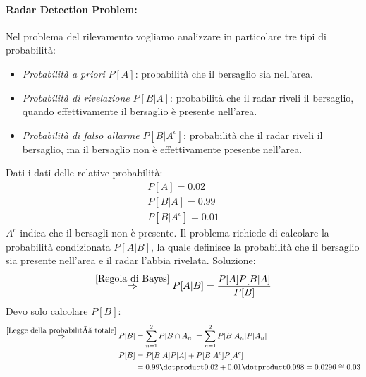             \paragraph{Radar Detection Problem:} Nel problema del rilevamento vogliamo analizzare in particolare tre tipi di probabilità:
                \begin{itemize}
                    \item {
                        \emph{Probabilità a priori} $P[A]$: probabilità che il bersaglio sia nell'area.
                    }
                    \item {
                        \emph{Probabilità di rivelazione} $P[B|A]$: probabilità che il radar riveli il bersaglio, quando effettivamente il bersaglio
                         è presente nell'area.
                    }
                    \item {
                        \emph{Probabilità di falso allarme} $P[B|A^c]$: probabilità che il radar riveli il bersaglio, ma il bersaglio non
                         è effettivamente presente nell'area. 
                    }
                \end{itemize}
                Dati i dati delle relative probabilità:
                \begin{gather}
                    P[A] = 0.02 \nonumber \\
                    P[B|A] = 0.99 \nonumber \\
                    P[B|A^c] = 0.01 \nonumber 
                \end{gather}
                $A^c$ indica che il bersagli non è presente. Il problema richiede di calcolare la probabilità condizionata
                $P[A|B]$, la quale definisce la probabilità che il bersaglio sia presente nell'area e il radar l'abbia rivelata.
                Soluzione:
                \[
                    \overset{\ref{Regola di Bayes}}{\Rightarrow} P[A|B] = \frac{P[A]P[B|A]}{P[B]}    
                \]                    
                Devo solo calcolare $P[B]$:
                \begin{align}
                        \overset{\ref{Legge della probabilità totale}}{\Rightarrow} P[B] &= \sum_{n=1}^{2} P[B\cap A_n] = \sum_{n=1}^{2} P[B|A_n] P[A_n] \nonumber \\
                        P[B] &= P[B|A]P[A] + P[B|A^c]P[A^c] \nonumber \\
                             &= 0.99\dotproduct 0.02 + 0.01 \dotproduct 0.098 = 0.0296 \cong 0.03  \nonumber       
                \end{align}

